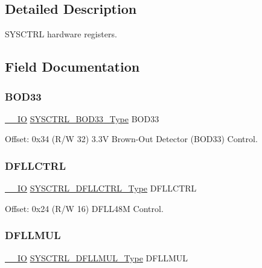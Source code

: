 \subsection{Detailed Description}
S\+Y\+S\+C\+T\+RL hardware registers. 

\subsection{Field Documentation}
\mbox{\label{struct_sysctrl_a889177f83fff9b146ba0946792ca02ac}} 
\subsubsection{\texorpdfstring{BOD33}{BOD33}}
{\footnotesize\ttfamily \mbox{\hyperlink{core__cm0plus_8h_aec43007d9998a0a0e01faede4133d6be}{\+\_\+\+\_\+\+IO}} \mbox{\hyperlink{union_s_y_s_c_t_r_l___b_o_d33___type}{S\+Y\+S\+C\+T\+R\+L\+\_\+\+B\+O\+D33\+\_\+\+Type}} B\+O\+D33}



Offset\+: 0x34 (R/W 32) 3.\+3V Brown-\/\+Out Detector (B\+O\+D33) Control. 

\mbox{\label{struct_sysctrl_a012d1f947bb97eaa9d093d7a3870c783}} 
\subsubsection{\texorpdfstring{DFLLCTRL}{DFLLCTRL}}
{\footnotesize\ttfamily \mbox{\hyperlink{core__cm0plus_8h_aec43007d9998a0a0e01faede4133d6be}{\+\_\+\+\_\+\+IO}} \mbox{\hyperlink{union_s_y_s_c_t_r_l___d_f_l_l_c_t_r_l___type}{S\+Y\+S\+C\+T\+R\+L\+\_\+\+D\+F\+L\+L\+C\+T\+R\+L\+\_\+\+Type}} D\+F\+L\+L\+C\+T\+RL}



Offset\+: 0x24 (R/W 16) D\+F\+L\+L48M Control. 

\mbox{\label{struct_sysctrl_a32426316b39e0cdc64c497f66f4cb270}} 
\subsubsection{\texorpdfstring{DFLLMUL}{DFLLMUL}}
{\footnotesize\ttfamily \mbox{\hyperlink{core__cm0plus_8h_aec43007d9998a0a0e01faede4133d6be}{\+\_\+\+\_\+\+IO}} \mbox{\hyperlink{union_s_y_s_c_t_r_l___d_f_l_l_m_u_l___type}{S\+Y\+S\+C\+T\+R\+L\+\_\+\+D\+F\+L\+L\+M\+U\+L\+\_\+\+Type}} D\+F\+L\+L\+M\+UL}



